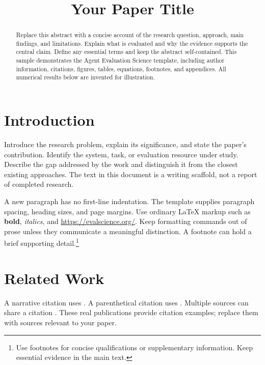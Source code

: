 \documentclass[11pt,a4paper]{article}
\title[Your Short Paper Title]{Your Paper Title}
\begin{document}
\maketitle

\begin{abstract}
Replace this abstract with a concise account of the research question, approach,
main findings, and limitations. Explain what is evaluated and why the evidence
supports the central claim. Define any essential terms and keep the abstract
self-contained. This sample demonstrates the Agent Evaluation Science template,
including author information, citations, figures, tables, equations, footnotes,
and appendices. All numerical results below are invented for illustration.
\end{abstract}

\section{Introduction}
\label{sec:introduction}
Introduce the research problem, explain its significance, and state the paper's
contribution. Identify the system, task, or evaluation resource under study.
Describe the gap addressed by the work and distinguish it from the closest
existing approaches. The text in this document is a writing scaffold, not a
report of completed research.

A new paragraph has no first-line indentation. The template supplies paragraph
spacing, heading sizes, and page margins. Use ordinary LaTeX markup such as
\textbf{bold}, \emph{italics}, and \url{https://evalscience.org/}. Keep formatting
commands out of prose unless they communicate a meaningful distinction.
A footnote can hold a brief supporting detail.\footnote{Use footnotes for concise
qualifications or supplementary information. Keep essential evidence in the main text.}

\section{Related Work}
\label{sec:related}
A narrative citation uses \citet{hua2025charting}. A parenthetical citation
uses \citep{na2025psychotherapy}. Multiple sources can share a citation
\citep{ma2025manipulation,hua2025scoping}. These real publications provide citation
examples; replace them with sources relevant to your paper.
\end{document}
